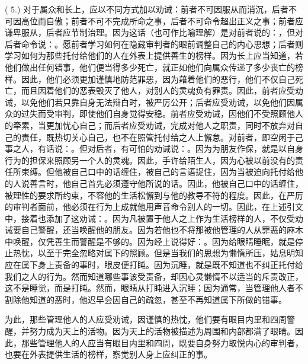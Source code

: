 ( 5.) 对于属众和长上，应以不同方式加以劝诫：前者不可因服从而消沉，后者不可因高位而自傲；前者不可不完成所命之事，后者不可命令超出正义之事；前者应谦卑服从，后者应节制治理。因为这话（也可作比喻理解）是对前者说的：，但对后者命令说：。愿前者学习如何在隐藏审判者的眼前调整自己的内心思想；后者则学习如何为那些托付给他们的人在外表上提供善生的榜样。因为长上应当知道，若他们做出任何错事，他们便当得多少死亡，就正如他们向属众传递了多少丧亡的榜样。因此，他们必须更加谨慎地防范罪恶，因为藉着他们的恶行，他们不仅自己死亡，而且因着他们的恶表毁灭了他人，对别人的灵魂负有罪责。因此，前者应受劝诫，以免他们若只靠自身无法辩白时，被严厉公开；后者应受劝诫，以免他们因属众的过失而受审判，即使他们自身觉得安稳。前者应受劝诫，因他们不受照顾他人的牵累，当更加忧心自己；而后者应受劝诫，完成对他人之职责，同时不放弃对自己的责任，既热切关心自己，也不在照管托付给之人上懈怠。对前者，即空闲于己事之人，有话说：。但对后者，有可怕的劝诫说：。因为为朋友作保，就是以自身行为的担保来照顾另一个人的灵魂。因此，手许给陌生人，因为心被以前没有的责任所束缚。但他被自己口中的话缠住，被自己的言语捉住，因为当被迫向托付给他的人说善言时，他自己首先必须遵守他所说的话。因此，他被自己口中的话缠住，被理性的要求所约束，不容他的生活松懈到与他的教导不符的程度。因此，在严厉的审判者面前，他必须在行为上成就他用声音命令别人的一切。因此，在上述引文中，接着也添加了这劝诫：。因为凡被置于他人之上作为生活榜样的人，不仅受劝诫要自己警醒，还当唤醒他的朋友。因为若他也不将那被他管理的人从罪恶的麻木中唤醒，仅凭善生而警醒是不够的。因为经上说得好：。因为给眼睛睡眠，就是停止热忱，以至于完全忽略对属下的照顾。但是当我们的思想为懒惰所压，姑息明知应在属下身上责备的事时，眼皮便打盹。因为沉睡，就是既不知道也不纠正托付给我们之人的行为。然而知道哪些事该受责备，却因心灵懒惰不以适当的斥责改正，这不是睡觉，而是打盹。然而，眼睛从打盹进入沉睡；因为通常，当管理他人者不割除他知道的恶时，他迟早会因自己的疏忽，甚至不再知道属下所做的错事。\par

为此，那些管理他人的人应受劝诫，因谨慎的热忱，他们要有眼目内里和四周警醒，并努力成为天上的活物。因为天上的活物被描述为周围和内部都满了眼睛。因此，那些管理他人的人应当有眼目内里和四周，既要自身努力取悦内心的审判者，也要在外表提供生活的榜样，察觉别人身上应纠正的事。\par

